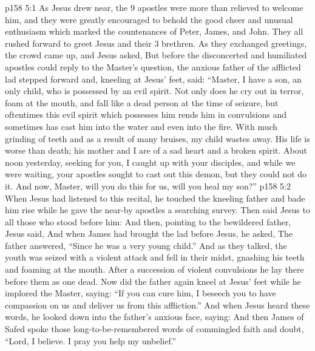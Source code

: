 \vs p158 5:1 As Jesus drew near, the 9 apostles were more than relieved to welcome him, and they were greatly encouraged to behold the good cheer and unusual enthusiasm which marked the countenances of Peter, James, and John. They all rushed forward to greet Jesus and their 3 brethren. As they exchanged greetings, the crowd came up, and Jesus asked,  But before the disconcerted and humiliated apostles could reply to the Master’s question, the anxious father of the afflicted lad stepped forward and, kneeling at Jesus’ feet, said: “Master, I have a son, an only child, who is possessed by an evil spirit. Not only does he cry out in terror, foam at the mouth, and fall like a dead person at the time of seizure, but oftentimes this evil spirit which possesses him rends him in convulsions and sometimes has cast him into the water and even into the fire. With much grinding of teeth and as a result of many bruises, my child wastes away. His life is worse than death; his mother and I are of a sad heart and a broken spirit. About noon yesterday, seeking for you, I caught up with your disciples, and while we were waiting, your apostles sought to cast out this demon, but they could not do it. And now, Master, will you do this for us, will you heal my son?”
\vs p158 5:2 When Jesus had listened to this recital, he touched the kneeling father and bade him rise while he gave the near\hyp{}by apostles a searching survey. Then said Jesus to all those who stood before him:  And then, pointing to the bewildered father, Jesus said,  And when James had brought the lad before Jesus, he asked,  The father answered, “Since he was a very young child.” And as they talked, the youth was seized with a violent attack and fell in their midst, gnashing his teeth and foaming at the mouth. After a succession of violent convulsions he lay there before them as one dead. Now did the father again kneel at Jesus’ feet while he implored the Master, saying: “If you can cure him, I beseech you to have compassion on us and deliver us from this affliction.” And when Jesus heard these words, he looked down into the father’s anxious face, saying:  And then James of Safed spoke those long\hyp{}to\hyp{}be\hyp{}remembered words of commingled faith and doubt, “Lord, I believe. I pray you help my unbelief.”
